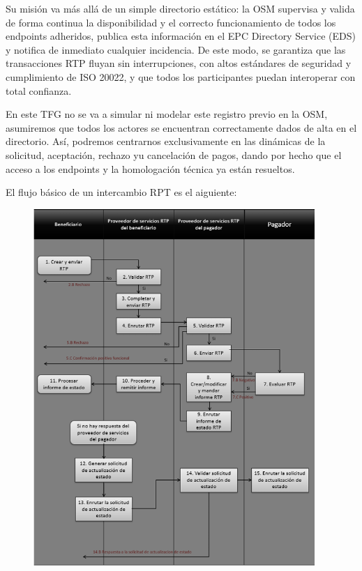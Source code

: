 Su misión va más allá de un simple directorio estático: la OSM supervisa y valida de forma continua la disponibilidad y el correcto funcionamiento de todos los endpoints adheridos, publica esta información en el EPC Directory Service (EDS) y notifica de inmediato cualquier incidencia. De este modo, se garantiza que las transacciones RTP fluyan sin interrupciones, con altos estándares de seguridad y cumplimiento de ISO 20022, y que todos los participantes puedan interoperar con total confianza.

En este TFG no se va a simular ni modelar este registro previo en la OSM, asumiremos que todos los actores se encuentran correctamente dados de alta en el directorio. Así, podremos centrarnos exclusivamente en las dinámicas de la solicitud, aceptación, rechazo yu cancelación de pagos, dando por hecho que el acceso a los endpoints y la homologación técnica ya están resueltos.

El flujo básico de un intercambio RPT es el aiguiente:
\newpage

\begin{figure}[H]
  \centering
  \includegraphics[width=0.95\textwidth, height=0.95\textheight, keepaspectratio]{Imagenes/Flujo.png}
  \label{fig:Flujo}
\end{figure}


